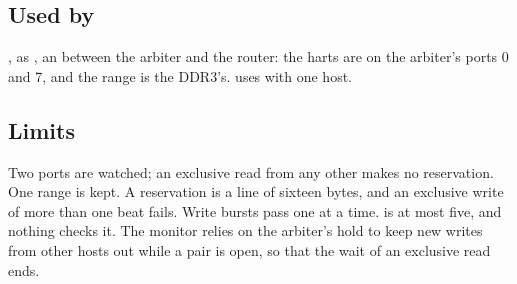 \subsection*{Used by}

, as , an
 between the arbiter
and the router: the harts are on the arbiter's ports 0 and 7, and the
range is the DDR3's.  uses
 with one host.

\subsection*{Limits}

Two ports are watched; an exclusive read from any other makes no
reservation. One range is kept. A reservation is a line of sixteen
bytes, and an exclusive write of more than one beat fails. Write bursts
pass one at a time.  is at most five, and nothing checks it.
The monitor relies on the arbiter's hold to keep new writes from other
hosts out while a pair is open, so that the wait of an exclusive read
ends.
